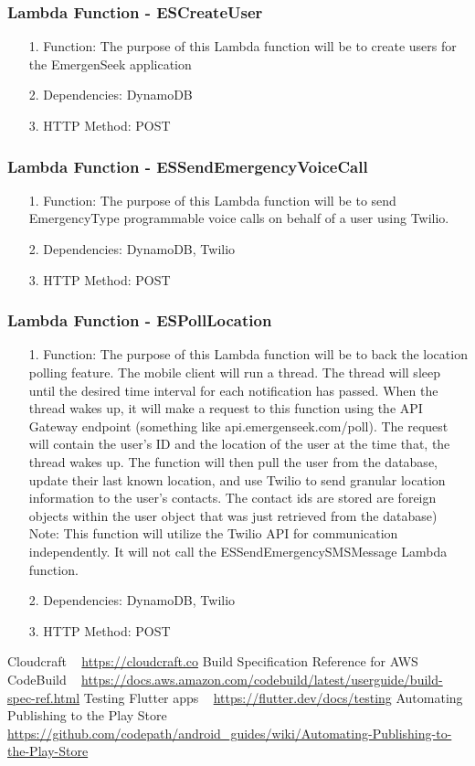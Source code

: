 \documentclass[10pt, a4paper]{article}
\begin{document}
\subsubsection{Lambda Function - ESCreateUser}
\begin{enumerate}
	\item[1.] Function: The purpose of this Lambda function will be to create users for the EmergenSeek application
	\item[2.] Dependencies: DynamoDB
	\item[3.] HTTP Method: POST
\end{enumerate}

\subsubsection{Lambda Function - ESSendEmergencyVoiceCall}
\begin{enumerate}
	\item[1.] Function: The purpose of this Lambda function will be to send EmergencyType programmable voice calls on behalf of a user using Twilio.
	\item[2.] Dependencies: DynamoDB, Twilio
	\item[3.] HTTP Method: POST
\end{enumerate}

\subsubsection{Lambda Function - ESPollLocation}
\begin{enumerate}
	\item[1.] Function: The purpose of this Lambda function will be to back the location polling feature. The mobile client will run a thread. The thread will sleep until the desired time interval for each notification has passed. When the thread wakes up, it will make a request to this function using the API Gateway endpoint (something like api.emergenseek.com/poll). The request will contain the user's ID and the location of the user at the time that, the thread wakes up. The function will then pull the user from the database, update their last known location, and use Twilio to send granular location information to the user's contacts. The contact ids are stored are foreign objects within the user object that was just retrieved from the database) Note: This function will utilize the Twilio API for communication independently. It will not call the ESSendEmergencySMSMessage Lambda function.
	\item[2.] Dependencies: DynamoDB, Twilio
	\item[3.] HTTP Method: POST
\end{enumerate}

	
\begin{thebibliography}{9}
Cloudcraft ~ \url{https://cloudcraft.co}
Build Specification Reference for AWS CodeBuild ~ \url{https://docs.aws.amazon.com/codebuild/latest/userguide/build-spec-ref.html}
Testing Flutter apps ~ \url{https://flutter.dev/docs/testing}
Automating Publishing to the Play Store ~ \url{https://github.com/codepath/android_guides/wiki/Automating-Publishing-to-the-Play-Store}
\end{thebibliography}
\end{document}

